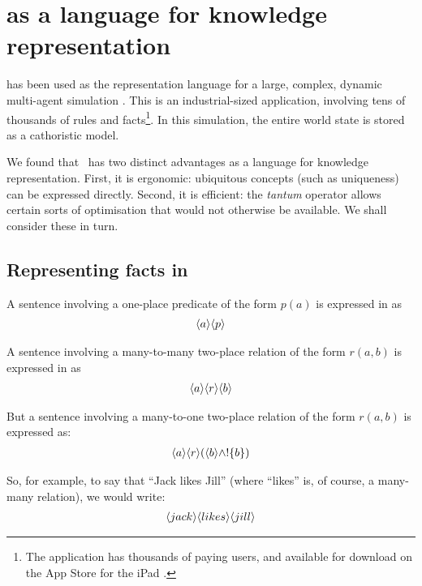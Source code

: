 \section{\Cathoristic{} as a language for knowledge representation}\label{kr}


\Cathoristic{} has been used as the representation language for a
large, complex, dynamic multi-agent simulation \cite{evans-and-short}.
This is an industrial-sized application, involving tens of thousands
of rules and facts\footnote{The application has thousands of paying
  users, and available for download on the App Store for the iPad
  \cite{Versu}.}.  In this simulation, the entire world state is stored
as a cathoristic model.
	
We found that \cathoristic\ has two distinct advantages as a language for knowledge representation. First, it is ergonomic: ubiquitous concepts (such as uniqueness) can be expressed directly.
Second, it is efficient: the \emph{tantum} operator allows certain sorts of optimisation that would not otherwise be available.
We shall consider these in turn.

\subsection{Representing facts  in \cathoristic{}}

A sentence involving a one-place predicate of the form $p(a)$ is
expressed in \cathoristic{} as
\begin{eqnarray*}
   \langle a \rangle \langle p \rangle \end{eqnarray*}

\NI A sentence involving a many-to-many two-place relation of the form
$r(a,b)$ is expressed in \cathoristic{} as
\begin{eqnarray*}
  \langle a \rangle \langle r \rangle \langle b \rangle \end{eqnarray*}

\NI But a sentence involving a many-to-one two-place relation of the
form $r(a,b)$ is expressed as:
\begin{eqnarray*}
  \langle a \rangle \langle r \rangle (\langle b \rangle \land ! \{b\})
\end{eqnarray*}


\NI So, for example, to say that ``Jack likes Jill'' (where ``likes'' is,
of course, a many-many relation), we would write:
\begin{eqnarray*}
  \langle jack \rangle \langle likes \rangle \langle jill \rangle \end{eqnarray*}

